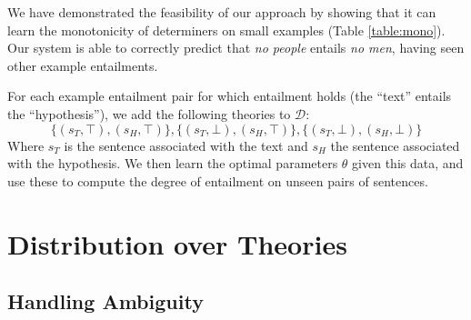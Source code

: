\documentclass{svmult}
\begin{document}
\begin{table}
\caption{Example of monotonically increasing (\emph{some}) and decreasing
  (\emph{no}) determiners and whether entailment holds between the text and
  the hypothesis. The bottom two lines show the degree of entailment
  determined by our system after parameters have been learnt on data
  generated from the first five lines.}
\label{table:mono}
\end{table}

We have demonstrated the feasibility of our approach by showing that
it can learn the monotonicity of determiners on small examples (Table
\ref{table:mono}). Our system is able to correctly predict that
\emph{no people} entails \emph{no men}, having seen other example
entailments.

For each example entailment pair for which entailment holds (the
``text'' entails the ``hypothesis''), we add
the following theories to $\mathcal{D}$:
\[
\{(s_T,\top),(s_H,\top)\}, \{(s_T,\bot),(s_H,\top)\},\{(s_T,\bot),(s_H,\bot)\}
\]
Where $s_T$ is the sentence associated with the text and $s_H$ the
sentence associated with the hypothesis. We then learn the optimal
parameters $\theta$ given this data, and use these to compute the
degree of entailment on unseen pairs of sentences.

\section{Distribution over Theories}

\subsection{Handling Ambiguity}
\end{document}
